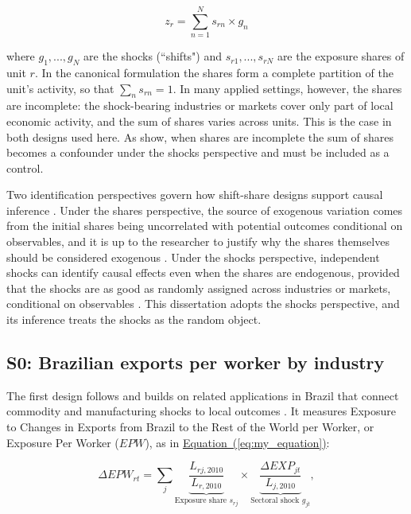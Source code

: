 \documentclass[
	11pt,				%
	oneside,			%
	a4paper,			%
	english,			%
	english				%
	]{abntex2ppgsi}
\theoremstyle{plain}
\theoremstyle{remark}
\theoremstyle{plain}%
\theoremstyle{remark}%
\begin{document}
\begin{equation}
    z_r = \sum_{n=1}^{N} s_{rn} \times g_n
        \label{eq:ssd}
\end{equation}

\noindent where \(g_1, ..., g_N\) are the shocks (``shifts") and \(s_{r1},...,s_{rN}\) are the exposure shares of unit $r$. In the canonical formulation the shares form a complete partition of the unit's activity, so that \(\sum_{n} s_{rn} = 1\). In many applied settings, however, the shares are incomplete: the shock-bearing industries or markets cover only part of local economic activity, and the sum of shares varies across units. This is the case in both designs used here. As  show, when shares are incomplete the sum of shares becomes a confounder under the shocks perspective and must be included as a control.

Two identification perspectives govern how shift-share designs support causal inference \cite{causal}. Under the shares perspective, the source of exogenous variation comes from the initial shares being uncorrelated with potential outcomes conditional on observables, and it is up to the researcher to justify why the shares themselves should be considered exogenous \cite{goldsmith}. Under the shocks perspective, independent shocks can identify causal effects even when the shares are endogenous, provided that the shocks are as good as randomly assigned across industries or markets, conditional on observables \cite{quasi-experimental}. This dissertation adopts the shocks perspective, and its inference treats the shocks as the random object.

\subsection{S0: Brazilian exports per worker by industry}

The first design follows  and builds on related applications in Brazil that connect commodity and manufacturing shocks to local outcomes \cite{costa2012,campellourdinez2021}. It measures Exposure to Changes in Exports from Brazil to the Rest of the World per Worker, or Exposure Per Worker ($EPW$), as in \hyperref[eq:my_equation]{Equation~(\ref{eq:my_equation})}:

\begin{equation}
\Delta EPW_{rt}
=
\sum_j
\underbrace{\frac{L_{rj,2010}}{L_{r,2010}}}_{\text{Exposure share } s_{rj}}
\times
\underbrace{\frac{\Delta EXP_{jt}}{L_{j,2010}}}_{\text{Sectoral shock } g_{jt}},
\label{eq:my_equation}
\end{equation}
\end{document}
